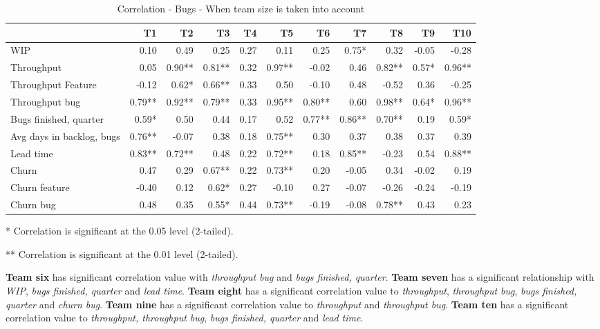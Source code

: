 \documentclass[UKenglish]{ifimaster}  %
\begin{document}
\FloatBarrier
\begin{table}[H]
  \begin{adjustwidth}{-1.5cm}{}
 \centering
 \begin{tabular}{|l|r|r|r|r|r|r|r|r|r|r|}
\hline
 &  \bf{T1} & \bf{T2} & \bf{T3} & \bf{T4} & \bf{T5} & \bf{T6} & \bf{T7} & \bf{T8} & \bf{T9} & \bf{T10}\\ \hline
 WIP  & 0.10 & 0.49 & 0.25 & 0.27 & 0.11 & 0.25 & 0.75* & 0.32 & -0.05 & -0.28 \\ \hline
 Throughput  & 0.05 & 0.90** & 0.81** & 0.32 & 0.97** & -0.02 & 0.46 & 0.82** & 0.57* & 0.96** \\ \hline
 Throughput Feature  & -0.12 & 0.62* & 0.66** & 0.33 & 0.50 & -0.10 & 0.48 & -0.52 & 0.36 & -0.25 \\ \hline
 Throughput bug  & 0.79** & 0.92** & 0.79** & 0.33 & 0.95** & 0.80** & 0.60 & 0.98** & 0.64* & 0.96** \\ \hline
 Bugs finished, quarter  & 0.59* & 0.50 & 0.44 & 0.17 & 0.52 & 0.77** & 0.86** & 0.70** & 0.19 & 0.59* \\ \hline
 Avg days in backlog, bugs  & 0.76** & -0.07 & 0.38 & 0.18 & 0.75** & 0.30 & 0.37 & 0.38 & 0.37 & 0.39 \\ \hline
 Lead time  & 0.83** & 0.72** & 0.48 & 0.22 & 0.72** & 0.18 & 0.85** & -0.23 & 0.54 & 0.88** \\ \hline
 Churn  & 0.47 & 0.29 & 0.67** & 0.22 & 0.73** & 0.20 & -0.05 & 0.34 & -0.02 & 0.19 \\ \hline
 Churn feature  & -0.40 & 0.12 & 0.62* & 0.27 & -0.10 & 0.27 & -0.07 & -0.26 & -0.24 & -0.19 \\ \hline
 Churn bug  & 0.48 & 0.35 & 0.55* & 0.44 & 0.73** & -0.19 & -0.08 & 0.78** & 0.43 & 0.23 \\ \hline
\end{tabular}
 \caption{Correlation - Bugs - When team size is taken into account}
 \label{corr:Bugs:v2}
 \centerline {* Correlation is significant at the 0.05 level (2-tailed).}
\centerline{** Correlation is significant at the 0.01 level (2-tailed).}
\end{adjustwidth}
\end{table}

\textbf{Team six} has significant correlation value with \textit{throughput bug} and \textit{bugs finished, quarter}. \textbf{Team seven} has a significant relationship with \textit{WIP}, \textit{bugs finished, quarter} and \textit{lead time}. \textbf{Team eight} has a significant correlation value to \textit{throughput}, \textit{throughput bug}, \textit{bugs finished, quarter} and \textit{churn bug}. \textbf{Team nine} has a significant correlation value to \textit{throughput} and \textit{throughput bug}. \textbf{Team ten} has a significant correlation value to \textit{throughput, throughput bug}, \textit{bugs finished, quarter} and \textit{lead time}.
\end{document}
